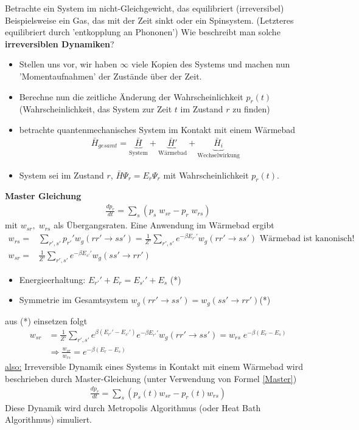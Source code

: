 \documentclass[12pt]{article}
\begin{document}
Betrachte ein System im nicht-Gleichgewicht, das equilibriert (irreversibel)  %
Beispielsweise ein Gas, das mit der Zeit sinkt oder ein Spinsystem. (Letzteres equilibriert durch 'entkopplung an Phononen') %
Wie beschreibt man solche \textbf{irreversiblen Dynamiken}?
\begin{itemize}
\item Stellen uns vor, wir haben $\infty$ viele Kopien des Systems und machen nun 'Momentaufnahmen' der Zustände über der Zeit. 
\item Berechne nun die zeitliche Änderung der Wahrscheinlichkeit $p_r(t)$ (Wahrscheinlichkeit, das System zur Zeit $t$ im Zustand $r$ zu finden)
\item betrachte quantenmechanisches System im Kontakt mit einem Wärmebad
\begin{align}
\bar{H}_{gesamt} = \underbrace{ \bar{H}}_\text{System} + \underbrace{\bar{H}'}_\text{Wärmebad} + \underbrace{ \bar{H}_i}_\text{Wechselwirkung}
\end{align}
\item System sei im Zustand $r$, $\bar{H} \Psi_r = E_r \Psi_r$ mit Wahrscheinlichkeit $p_r(t)$.
\end{itemize}
\textbf{Master Gleichung}
\begin{align}
\frac{dp_r}{dt}= \sum_s \left( p_s \; w_{sr}  - p_r \; w_{rs} \right) 
\end{align}
mit $ w_{sr}, \;  w_{rs}$ als Übergangsraten. Eine  Anwendung im Wärmebad ergibt
\begin{align}
w_{rs}= & \sum_{r',s'} p_{r'}' w_g(rr' \rightarrow ss') = \frac{1}{Z'} \sum_{r',s'}  e^{-\beta E_{r'}'} w_g (rr' \rightarrow ss') \mbox{ Wärmebad ist kanonisch! } \\
w_{sr}= & \frac{1}{Z'} \sum_{r',s'}  e^{-\beta E_{s'}'} w_g (ss' \rightarrow rr')
\end{align}
\begin{itemize}
\item Energieerhaltung: $E_{r'}' + E_r = E_{s'}' + E_s$ (*)
\item Symmetrie im Gesamtsystem $w_g (rr' \rightarrow ss') = w_g (ss' \rightarrow rr')$(*)
\end{itemize}


aus (*) einsetzen folgt
\begin{align}
w_{sr}&= \frac{1}{Z'} \sum_{r',s'} e^{\beta (E_{r'}' -E_{s'}') } e^{-\beta E_{r'}'}  w_g (rr' \rightarrow ss') = w_{rs} \; e^{-\beta (E_r - E_s)} \\
& \Rightarrow  \frac{w_{sr}}{w_{rs}}= e^{-\beta (E_r - E_s)} \label{Master}
\end{align}
\underline{also:} Irreversible Dynamik eines Systems in Kontakt mit einem Wärmebad wird beschrieben durch Master-Gleichung (unter Verwendung von Formel \ref{Master})
\begin{align}
 \frac{dp_r}{dt}= \sum_s( p_s(t) w_{sr} - p_r(t) w_{rs})
\end{align}
 Diese Dynamik wird durch Metropolis Algorithmus (oder Heat Bath Algorithmus) simuliert. %
\end{document}
